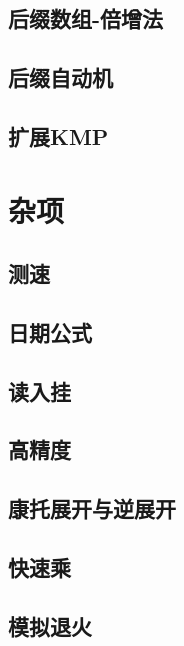 \documentclass[a4paper]{article}
\begin{document}
\subsection{后缀数组-倍增法}

\subsection{后缀自动机}

\subsection{扩展KMP}

\section{杂项}
\subsection{测速}

\subsection{日期公式}

\subsection{读入挂}

\subsection{高精度}

\subsection{康托展开与逆展开}

\subsection{快速乘}

\subsection{模拟退火}



\end{document}
